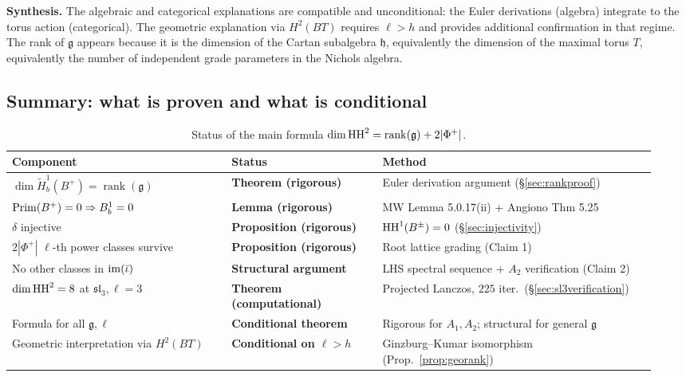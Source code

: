 \medskip
\noindent\textbf{Synthesis.} The algebraic and categorical explanations are compatible and unconditional: the Euler derivations (algebra) integrate to the torus action (categorical). The geometric explanation via $H^2(BT)$ requires $\ell > h$ and provides additional confirmation in that regime. The rank of $\mathfrak{g}$ appears because it is the dimension of the Cartan subalgebra $\mathfrak{h}$, equivalently the dimension of the maximal torus $T$, equivalently the number of independent grade parameters in the Nichols algebra.

\subsection{Summary: what is proven and what is conditional}

\begin{table}[htbp]
\centering
\caption{Status of the main formula $\dim \operatorname{HH}^2 = \operatorname{rank}(\mathfrak{g}) + 2|\Phi^+|$.}
\label{tab:proofstatus}
\small
\begin{tabular}{@{}p{0.32\linewidth}p{0.22\linewidth}p{0.40\linewidth}@{}}
\toprule
Component & Status & Method \\
\midrule
$\dim \tilde{H}^1_b(B^+) = \operatorname{rank}(\mathfrak{g})$ & \textbf{Theorem (rigorous)} & Euler derivation argument (\S\ref{sec:rankproof}) \\
$\operatorname{Prim}(B^+) = 0 \Rightarrow B^1_b = 0$ & \textbf{Lemma (rigorous)} & MW Lemma 5.0.17(ii) + Angiono Thm 5.25 \\
$\delta$ injective & \textbf{Proposition (rigorous)} & $\operatorname{HH}^1(B^\pm) = 0$ (\S\ref{sec:injectivity}) \\
$2|\Phi^+|$ $\ell$-th power classes survive & \textbf{Proposition (rigorous)} & Root lattice grading (Claim 1) \\
No other classes in $\operatorname{im}(\bar\iota)$ & \textbf{Structural argument} & LHS spectral sequence + $A_2$ verification (Claim 2) \\
$\dim \operatorname{HH}^2 = 8$ at $\mathfrak{sl}_3, \ell = 3$ & \textbf{Theorem (computational)} & Projected Lanczos, $225$ iter.\ (\S\ref{sec:sl3verification}) \\
Formula for all $\mathfrak{g}, \ell$ & \textbf{Conditional theorem} & Rigorous for $A_1, A_2$; structural for general $\mathfrak{g}$ \\
Geometric interpretation via $H^2(BT)$ & \textbf{Conditional on $\ell > h$} & Ginzburg--Kumar isomorphism (Prop.~\ref{prop:georank}) \\
\bottomrule
\end{tabular}
\end{table}


